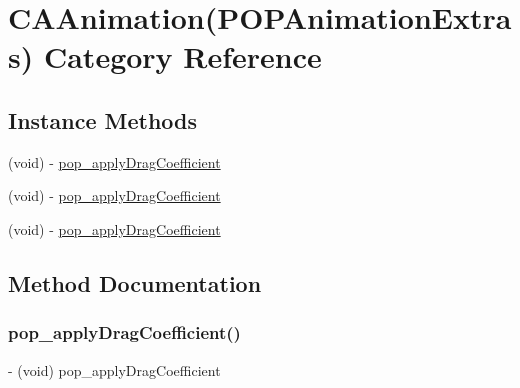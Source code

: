\hypertarget{category_c_a_animation_07_p_o_p_animation_extras_08}{}\section{C\+A\+Animation(P\+O\+P\+Animation\+Extras) Category Reference}
\label{category_c_a_animation_07_p_o_p_animation_extras_08}
\subsection*{Instance Methods}
\begin{DoxyCompactItemize}
\item 
(void) -\/ \mbox{\hyperlink{category_c_a_animation_07_p_o_p_animation_extras_08_aa7e4f22d1c895222080a430d9b4159fc}{pop\+\_\+apply\+Drag\+Coefficient}}
\item 
(void) -\/ \mbox{\hyperlink{category_c_a_animation_07_p_o_p_animation_extras_08_aa7e4f22d1c895222080a430d9b4159fc}{pop\+\_\+apply\+Drag\+Coefficient}}
\item 
(void) -\/ \mbox{\hyperlink{category_c_a_animation_07_p_o_p_animation_extras_08_aa7e4f22d1c895222080a430d9b4159fc}{pop\+\_\+apply\+Drag\+Coefficient}}
\end{DoxyCompactItemize}


\subsection{Method Documentation}
\mbox{\label{category_c_a_animation_07_p_o_p_animation_extras_08_aa7e4f22d1c895222080a430d9b4159fc}} 
\subsubsection{\texorpdfstring{pop\+\_\+apply\+Drag\+Coefficient()}{pop\_applyDragCoefficient()}\hspace{0.1cm}{\footnotesize\ttfamily [1/3]}}
{\footnotesize\ttfamily -\/ (void) pop\+\_\+apply\+Drag\+Coefficient \begin{DoxyParamCaption}{ }\end{DoxyParamCaption}}

